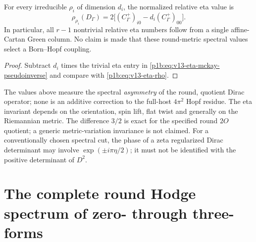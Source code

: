 \documentclass[11pt]{article}
\begin{document}
\begin{corollary}
\label{p1b:cor:v13-all-rho-green}
For every irreducible $\rho_i$ of dimension $d_i$, the normalized
relative eta value is
\begin{equation}
\label{p1b:eq:v13-rho-green}
 \boxed{\rho_{\rho_i}(D_\Gamma)=
 2\bigl[(C_\Gamma^+)_{i0}
       -d_i(C_\Gamma^+)_{00}\bigr].}
\end{equation}
In particular, all $r-1$ nontrivial relative eta numbers follow
from a single affine-Cartan Green column.  No claim is made that
these round-metric spectral values select a Born--Hopf coupling.
\end{corollary}
\begin{proof}
Subtract $d_i$ times the trivial eta entry in
\eqref{p1b:eq:v13-eta-mckay-pseudoinverse} and compare
with \eqref{p1b:eq:v13-eta-rho}.
\end{proof}

\begin{remark}
\label{p1b:rem:v13-eta-owner}
The values above measure the spectral \emph{asymmetry} of the round,
quotient Dirac operator; none is an additive correction to the
full-host $4\pi^2$ Hopf residue. The eta invariant depends on the
orientation, spin lift, flat twist and generally on the Riemannian
metric.  The difference $3/2$ is exact for the specified round
$2O$ quotient; a generic metric-variation invariance is not claimed.
For a conventionally chosen spectral cut, the phase of a zeta
regularized Dirac determinant may involve $\exp(\pm i\pi\eta/2)$;
it must not be identified with the positive determinant of $D^2$.
\end{remark}

\section{The complete round Hodge spectrum of zero- through three-forms}
\label{p1b:sec:v13-hodge}
\end{document}
